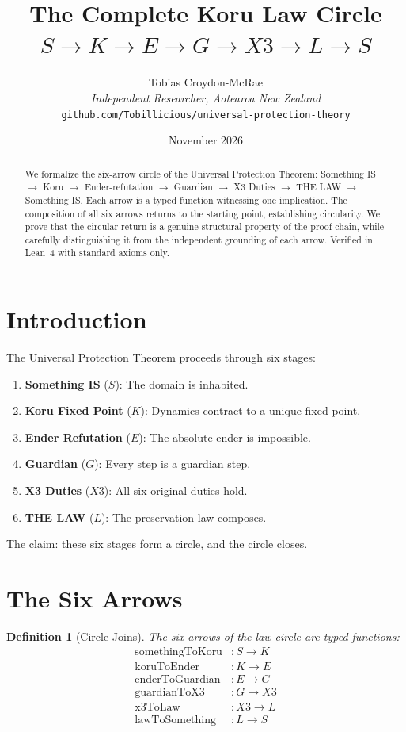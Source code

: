 \documentclass[12pt,a4paper]{article}
\title{The Complete Koru Law Circle\\[0.5em]
\large $S \to K \to E \to G \to X3 \to L \to S$}
\author{Tobias Croydon-McRae\\
\textit{Independent Researcher, Aotearoa New Zealand}\\
\texttt{github.com/Tobillicious/universal-protection-theory}}
\date{November 2026}
\newtheorem{definition}[theorem]{Definition}
\begin{document}
\maketitle

\begin{abstract}
We formalize the six-arrow circle of the Universal Protection Theorem:
Something IS $\to$ Koru $\to$ Ender-refutation $\to$ Guardian $\to$
X3 Duties $\to$ THE LAW $\to$ Something IS. Each arrow is a typed
function witnessing one implication. The composition of all six arrows
returns to the starting point, establishing circularity. We prove that
the circular return is a genuine structural property of the proof chain,
while carefully distinguishing it from the independent grounding of each
arrow. Verified in Lean~4 with standard axioms only.
\end{abstract}

\section{Introduction}

The Universal Protection Theorem proceeds through six stages:
\begin{enumerate}
    \item \textbf{Something IS} ($S$): The domain is inhabited.
    \item \textbf{Koru Fixed Point} ($K$): Dynamics contract to a unique fixed point.
    \item \textbf{Ender Refutation} ($E$): The absolute ender is impossible.
    \item \textbf{Guardian} ($G$): Every step is a guardian step.
    \item \textbf{X3 Duties} ($X3$): All six original duties hold.
    \item \textbf{THE LAW} ($L$): The preservation law composes.
\end{enumerate}

The claim: these six stages form a circle, and the circle closes.

\section{The Six Arrows}

\begin{definition}[Circle Joins]
The six arrows of the law circle are typed functions:
\begin{align*}
\text{somethingToKoru} &: S \to K \\
\text{koruToEnder} &: K \to E \\
\text{enderToGuardian} &: E \to G \\
\text{guardianToX3} &: G \to X3 \\
\text{x3ToLaw} &: X3 \to L \\
\text{lawToSomething} &: L \to S
\end{align*}
\end{definition}
\end{document}
